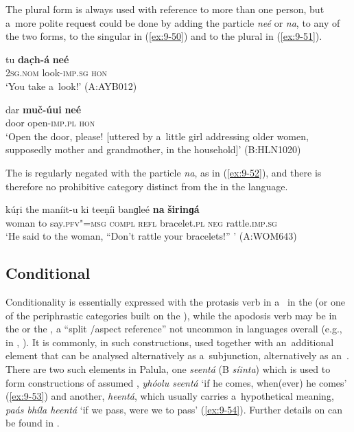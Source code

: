 The plural form is always used with reference to more than one person, but a~more polite request could be done by adding the particle \textit{neé} or \textit{na}, to any of the two forms, to the singular in (\ref{ex:9-50}) and to the plural in (\ref{ex:9-51}).

\begin{exe}
\ex
\label{ex:9-50}
\gll tu \textbf{dac̣h-á} \textbf{neé} \\
\textsc{2sg.nom} look-\textsc{imp.sg} \textsc{hon}  \\
\glt `You take a~look!' (A:AYB012)

\ex
\label{ex:9-51}
\gll dar \textbf{muč-úui} \textbf{neé} \\
door open-\textsc{imp.pl} \textsc{hon} \\
\glt `Open the door, please! [uttered by a~little girl addressing older women, supposedly mother and grandmother, in the household]' (B:HLN1020)
\end{exe}

The  is regularly negated with the  particle \textit{na}, as in (\ref{ex:9-52}), and there is therefore no prohibitive category distinct from the  in the language.

\begin{exe}
\ex
\label{ex:9-52}
\gll kúṛi the maníit-u ki teeṇíi banɡleé \textbf{na} \textbf{širinɡá} \\
woman to say.\textsc{pfv"=msg} \textsc{compl} \textsc{refl} bracelet.\textsc{pl} \textsc{neg} rattle.\textsc{imp.sg} \\
\glt `He said to the woman, ``Don't rattle your bracelets!'' ' (A:WOM643)
\end{exe}

\subsection{Conditional}
\label{subsec:9-2-2}

Conditionality is essentially expressed with the protasis verb in a~  in the  (or one of the periphrastic categories built on the ), while the apodosis verb may be in the  or the , a ``split /aspect reference'' not uncommon in languages overall (e.g., in \iliArabic, \citealt[80]{dahl1985}). It is commonly, in such constructions, used together with an~additional element that can be analysed alternatively as a~subjunction, alternatively as an~. There are two such elements in Palula, one \textit{seentá} (B \textit{síinta}) which is used to form constructions of assumed , \textit{yhóolu seentá} `if he comes, when(ever) he comes' (\ref{ex:9-53}) and another, \textit{heentá}, which usually carries a~hypothetical meaning, \textit{paás bhíla heentá} `if we pass, were we to pass' (\ref{ex:9-54}). Further details on  can be found in . 

